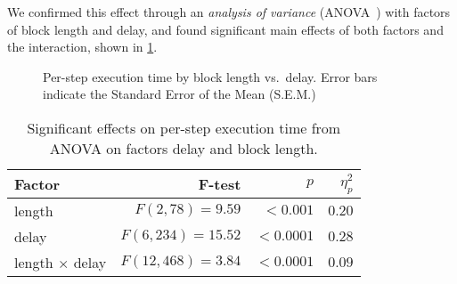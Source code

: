 \documentclass[10pt,letterpaper]{article}
\begin{document}
We confirmed this effect through an \emph{analysis of variance} (ANOVA~\cite{FUJIKOSHI1993ANOVA}) with factors of block length and delay, and found significant main effects of both factors and the interaction, shown in \cref{tab:anova:exectime}.


\begin{figure}[h]
    \centering
    \caption{Per-step execution time by block length vs.\ delay. Error bars indicate the Standard Error of the Mean (S.E.M.)}\label{fig:exectime}%
\end{figure}

\begin{table}[h]
  \centering
  \caption{Significant effects on per-step execution time from ANOVA on factors delay and block length.}\label{tab:anova:exectime}
  \setlength{\tabcolsep}{0pt}%
  \begin{tabular*}{\columnwidth}{@{\extracolsep{\fill}\quad}lrrr@{}}
    \toprule
    \textbf{Factor} & \textbf{F-test} & \( p \) & \( \eta^{2}_{p} \) \\
    \midrule
    length         &    \(F(2, 78) = 9.59\) &   \(< 0.001\) &           \(0.20\) \\
    delay          &  \(F(6, 234) = 15.52\) &  \(< 0.0001\) &           \(0.28\) \\
    length \(\times\) delay &  \(F(12, 468) = 3.84\) &  \(< 0.0001\) &           \(0.09\) \\
    \bottomrule
  \end{tabular*}
\end{table}
\end{document}
